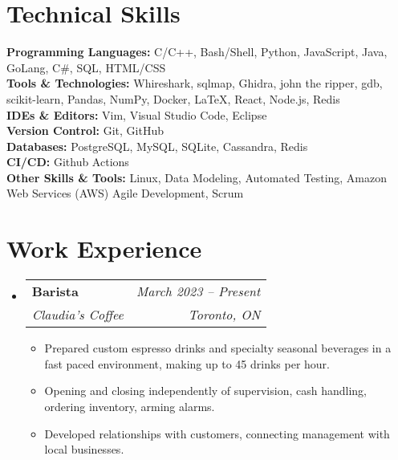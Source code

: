 \documentclass[letterpaper,11pt]{article}
\makeatletter
\newcommand{\resumeItem}[1]{
  \item\small{
    {#1 \vspace{-2pt}}
  }
}
\newcommand{\resumeSubheading}[4]{
  \vspace{-2pt}\item
    \begin{tabular*}{0.97\textwidth}[t]{l@{\extracolsep{\fill}}r}
      \textbf{#1} & #2 \\
      \textit{\small#3} & \textit{\small #4} \\
    \end{tabular*}\vspace{-7pt}
}
\newcommand{\resumeSubHeadingListStart}{\begin{itemize}[leftmargin=0.15in, label={}]}
\newcommand{\resumeSubHeadingListEnd}{\end{itemize}}
\newcommand{\resumeItemListStart}{\begin{itemize}}
\newcommand{\resumeItemListEnd}{\end{itemize}\vspace{-5pt}}
\makeatother
\begin{document}
%
\section{Technical Skills}
 \begin{itemize}[leftmargin=0.15in, label={}]
    \small{\item{
	\textbf{Programming Languages:} C/C++, Bash/Shell, Python, JavaScript, Java, GoLang, C\#, SQL, HTML/CSS\\
	\textbf{Tools \& Technologies:} Whireshark, sqlmap, Ghidra, john the ripper, gdb, scikit-learn, Pandas, NumPy, Docker, LaTeX, React, Node.js, Redis \\
	\textbf{IDEs \& Editors:} Vim, Visual Studio Code, Eclipse \\
	\textbf{Version Control:} Git, GitHub \\
	\textbf{Databases:} PostgreSQL, MySQL, SQLite, Cassandra, Redis\\
	\textbf{CI/CD:} Github Actions \\
	\textbf{Other Skills \& Tools:} Linux, Data Modeling, Automated Testing, Amazon Web Services (AWS) Agile Development, Scrum
    }}
 \end{itemize}


\section{Work Experience}
  \resumeSubHeadingListStart

    \resumeSubheading
    {Barista}{\emph{March 2023 -- Present}}
      {Claudia's Coffee}{Toronto, ON}
      \resumeItemListStart
        \resumeItem{Prepared custom espresso drinks and specialty seasonal beverages in a fast paced environment, making up to 45 drinks per hour.}
	\resumeItem{Opening and closing independently of supervision, cash handling, ordering inventory, arming alarms.}
	\resumeItem{Developed relationships with customers, connecting management with local businesses.}
      \resumeItemListEnd

  \resumeSubHeadingListEnd


\end{document}
